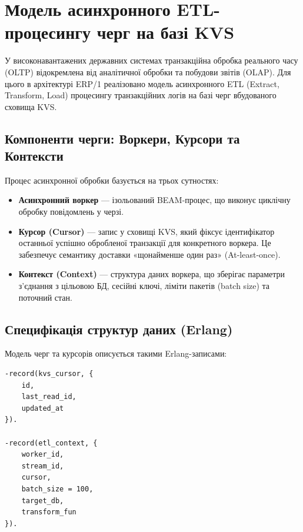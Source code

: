 \documentclass{article}
\begin{document}
\section{Модель асинхронного ETL-процесингу черг на базі KVS}
   
У високонавантажених державних системах транзакційна обробка реального часу (OLTP) відокремлена від аналітичної обробки та побудови звітів (OLAP). Для цього в архітектурі ERP/1 реалізовано модель асинхронного ETL (Extract, Transform, Load) процесингу транзакційних логів на базі черг вбудованого сховища KVS.

\subsection{Компоненти черги: Воркери, Курсори та Контексти}
Процес асинхронної обробки базується на трьох сутностях:
\begin{itemize}
    \item \textbf{Асинхронний воркер} --- ізольований BEAM-процес, що виконує циклічну обробку повідомлень у черзі.
    \item \textbf{Курсор (Cursor)} --- запис у сховищі KVS, який фіксує ідентифікатор останньої успішно обробленої транзакції для конкретного воркера. Це забезпечує семантику доставки «щонайменше один раз» (At-least-once).
    \item \textbf{Контекст (Context)} --- структура даних воркера, що зберігає параметри з'єднання з цільовою БД, сесійні ключі, ліміти пакетів (batch size) та поточний стан.
\end{itemize}

\subsection{Специфікація структур даних (Erlang)}
Модель черг та курсорів описується такими Erlang-записами:
\begin{lstlisting}
-record(kvs_cursor, {
    id,
    last_read_id,
    updated_at
}).

-record(etl_context, {
    worker_id,
    stream_id,
    cursor,
    batch_size = 100,
    target_db,
    transform_fun
}).
\end{lstlisting}
\end{document}

